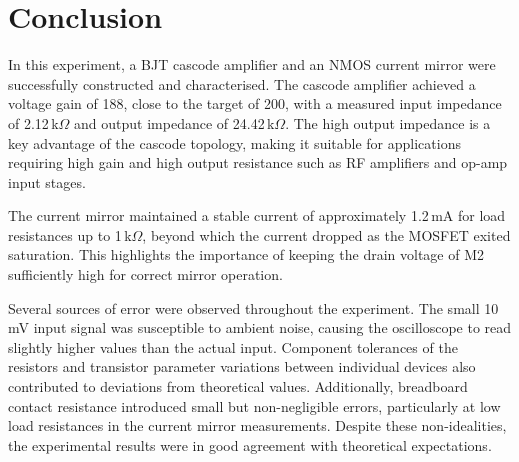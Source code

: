 \documentclass[12pt]{article}
\begin{document}
\section{Conclusion}

In this experiment, a BJT cascode amplifier and an NMOS current mirror were 
successfully constructed and characterised. The cascode amplifier achieved a voltage 
gain of 188, close to the target of 200, with a measured input impedance of 
2.12\,k$\Omega$ and output impedance of 24.42\,k$\Omega$. The high output impedance 
is a key advantage of the cascode topology, making it suitable for applications 
requiring high gain and high output resistance such as RF amplifiers and op-amp 
input stages.

The current mirror maintained a stable current of approximately 1.2\,mA for load 
resistances up to 1\,k$\Omega$, beyond which the current dropped as the MOSFET 
exited saturation. This highlights the importance of keeping the drain voltage of M2 
sufficiently high for correct mirror operation.

Several sources of error were observed throughout the experiment. The small 10\,mV 
input signal was susceptible to ambient noise, causing the oscilloscope to read 
slightly higher values than the actual input. Component tolerances of the resistors 
and transistor parameter variations between individual devices also contributed to 
deviations from theoretical values. Additionally, breadboard contact resistance 
introduced small but non-negligible errors, particularly at low load resistances in 
the current mirror measurements. Despite these non-idealities, the experimental 
results were in good agreement with theoretical expectations.
\end{document}
